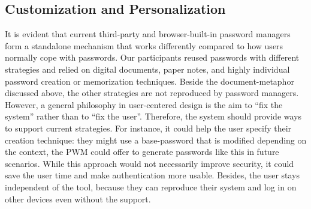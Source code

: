 
\subsection{Customization and Personalization}
It is evident that current third-party and browser-built-in password managers form a standalone mechanism that works differently compared to how users normally cope with passwords. Our participants reused passwords with different strategies and relied on digital documents, paper notes, and highly individual password creation or memorization techniques. Beside the document-metaphor discussed above, the other strategies are not reproduced by password managers. However, a general philosophy in user-centered design is the aim to ``fix the system'' rather than to ``fix the user''. Therefore, the system should provide ways to support current strategies. For instance, it could help the user specify their creation technique: they might use a base-password that is modified depending on the context, the PWM could offer to generate passwords like this in future scenarios. While this approach would not necessarily improve security, it could save the user time and make authentication more usable. Besides, the user stays independent of the tool, because they can reproduce their system and log in on other devices even without the support. 



